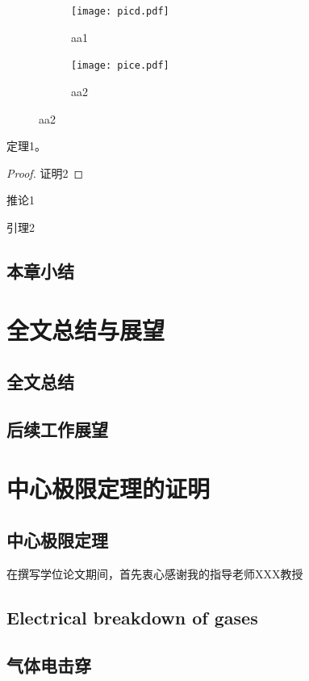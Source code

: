 \documentclass[bachelor]{NCEPU-thesis}
\begin{document}
\begin{figure}[h]
\begin{subfigure}[b]{0.5\linewidth}
\label{picd}
\texttt{[image: picd.pdf]}
\caption{aa1}
\end{subfigure}
\begin{subfigure}[b]{0.5\linewidth}
\label{pice}
\texttt{[image: pice.pdf]}
\caption{aa2}
\end{subfigure}
\label{fig2}
\end{figure}


\begin{theorem}
定理1。
\end{theorem}
\begin{proof}
证明2
\end{proof}
\begin{corollary}
推论1
\end{corollary}
\begin{lemma}
引理2
\end{lemma}

\section{本章小结}

\chapter{全文总结与展望}

\section{全文总结}

\section{后续工作展望}






\nocite{*}


\thesisappendix

\chapter{中心极限定理的证明}

\section{中心极限定理}


\thesisacknowledgement
在撰写学位论文期间，首先衷心感谢我的指导老师XXX教授



\thesistranslationoriginal

\section{Electrical breakdown of gases}


\thesistranslationchinese

\section{气体电击穿}
\end{document}
